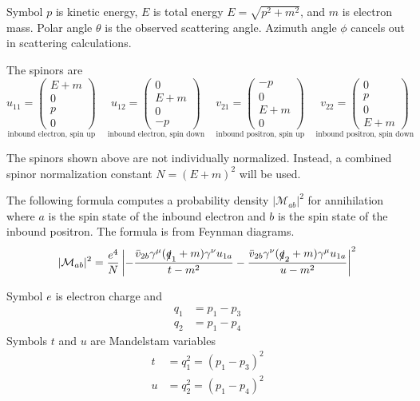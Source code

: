 \documentclass[12pt]{article}
\begin{document}
\noindent
Symbol $p$ is kinetic energy,
$E$ is total energy $E=\sqrt{p^2+m^2}$,
and $m$ is electron mass.
Polar angle $\theta$ is the observed scattering angle.
Azimuth angle $\phi$ cancels out in scattering calculations.

\bigskip
\noindent
The spinors are
\begin{equation*}
\underset{\text{inbound electron, spin up}}
{u_{11}=\begin{pmatrix}E+m\\0\\p\\0\end{pmatrix}}
\quad
\underset{\text{inbound electron, spin down}}
{u_{12}=\begin{pmatrix}0\\E+m\\0\\-p\end{pmatrix}}
\quad
\underset{\text{inbound positron, spin up}}
{v_{21}=\begin{pmatrix}-p\\0\\E+m\\0\end{pmatrix}}
\quad
\underset{\text{inbound positron, spin down}}
{v_{22}=\begin{pmatrix}0\\p\\0\\E+m\end{pmatrix}}
\end{equation*}

\noindent
The spinors shown above are not individually normalized.
Instead, a combined spinor normalization constant $N=(E+m)^2$ will be used.

\bigskip
\noindent
The following formula computes a probability density $|\mathcal{M}_{ab}|^2$
for annihilation where $a$ is the spin state of the inbound electron and
$b$ is the spin state of the inbound positron.
The formula is from Feynman diagrams.
\begin{equation*}
|\mathcal{M}_{ab}|^2
=
\frac{e^4}{N}
\left|
-\frac{\bar{v}_{2b}\gamma^\mu(\slashed{q}_1+m)\gamma^\nu u_{1a}}{t-m^2}
-\frac{\bar{v}_{2b}\gamma^\nu(\slashed{q}_2+m)\gamma^\mu u_{1a}}{u-m^2}
\right|^2
\end{equation*}

\noindent
Symbol $e$ is electron charge and
\begin{align*}
q_1&=p_1-p_3
\\
q_2&=p_1-p_4
\end{align*}
Symbols $t$ and $u$ are Mandelstam variables
\begin{align*}
t&=q_1^2=(p_1-p_3)^2
\\
u&=q_2^2=(p_1-p_4)^2
\end{align*}
\end{document}
